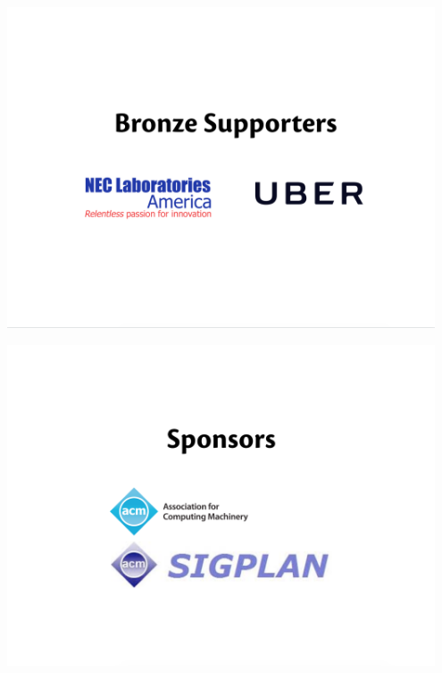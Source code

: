 \begin{center}
\includegraphics[width=0.95\textwidth]{img/supporter-bronze.png}
\end{center}

\begin{center}
\includegraphics[width=0.95\textwidth]{img/sponsor.png}
\end{center}

\newpage
